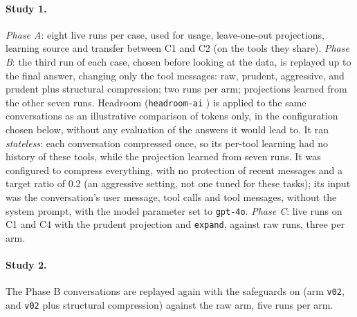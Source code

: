 \paragraph{Study 1.} \emph{Phase A}: eight live runs per case, used for usage, leave-one-out projections,
learning source and transfer between C1 and C2 (on the tools they share). \emph{Phase B}: the third run of each
case, chosen before looking at the data, is replayed up to the final answer, changing only the tool messages:
raw, prudent, aggressive, and prudent plus structural compression; two runs per arm; projections learned from the
other seven runs. Headroom (\texttt{headroom-ai} \HeadroomVersion) is applied to the same conversations as an illustrative comparison of
tokens only, in the configuration chosen below, without any evaluation of the answers it would lead to. It ran
\emph{stateless}: each conversation compressed once, so its per-tool learning had no history of these tools, while
the projection learned from seven runs. It was configured to compress everything, with no protection of recent
messages and a target ratio of 0.2 (an aggressive setting, not one tuned for these tasks); its input was the
conversation's user message, tool calls and tool messages, without the system prompt, with the model parameter set to
\texttt{gpt-4o}. \emph{Phase C}: live
runs on C1 and C4 with the prudent projection and \texttt{expand}, against raw runs, three per arm.

\paragraph{Study 2.} The Phase B conversations are replayed again with the safeguards on (arm \texttt{v02}, and
\texttt{v02} plus structural compression) against the raw arm, five runs per arm.

